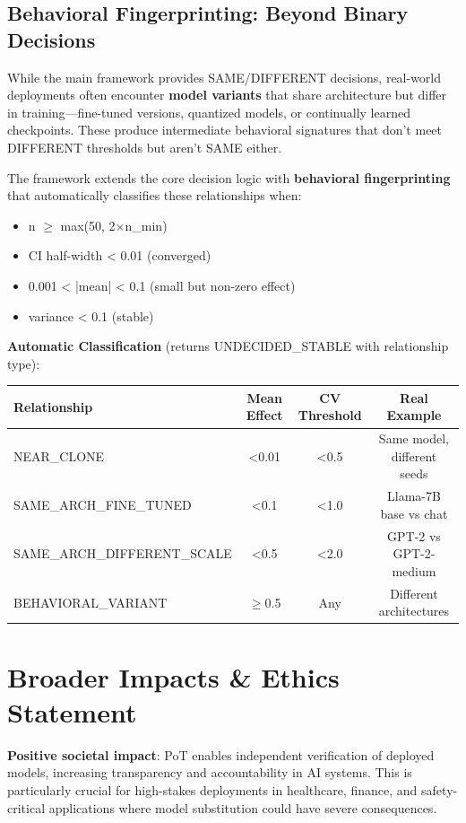 \documentclass{article}
\begin{document}
\subsection{Behavioral Fingerprinting: Beyond Binary Decisions}
\label{sec:behavioral-fingerprinting}

While the main framework provides SAME/DIFFERENT decisions, real-world deployments often encounter \textbf{model variants} that share architecture but differ in training---fine-tuned versions, quantized models, or continually learned checkpoints. These produce intermediate behavioral signatures that don't meet DIFFERENT thresholds but aren't SAME either.

The framework extends the core decision logic with \textbf{behavioral fingerprinting} that automatically classifies these relationships when:
\begin{itemize}
\item n $\geq$ max(50, 2×n\_min)
\item CI half-width < 0.01 (converged)
\item 0.001 < |mean| < 0.1 (small but non-zero effect)
\item variance < 0.1 (stable)
\end{itemize}

\textbf{Automatic Classification} (returns UNDECIDED\_STABLE with relationship type):

\begin{table}[h]
\centering
\begin{tabular}{lccc}
\toprule
Relationship & Mean Effect & CV Threshold & Real Example \\
\midrule
NEAR\_CLONE & <0.01 & <0.5 & Same model, different seeds \\
SAME\_ARCH\_FINE\_TUNED & <0.1 & <1.0 & Llama-7B base vs chat \\
SAME\_ARCH\_DIFFERENT\_SCALE & <0.5 & <2.0 & GPT-2 vs GPT-2-medium \\
BEHAVIORAL\_VARIANT & $\geq$0.5 & Any & Different architectures \\
\bottomrule
\end{tabular}
\end{table}

\section{Broader Impacts \& Ethics Statement}

\textbf{Positive societal impact}: PoT enables independent verification of deployed models, increasing transparency and accountability in AI systems. This is particularly crucial for high-stakes deployments in healthcare, finance, and safety-critical applications where model substitution could have severe consequences.
\end{document}
